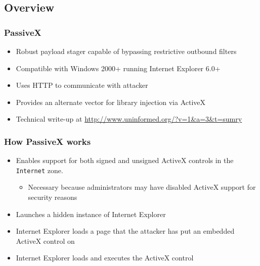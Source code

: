 \documentclass{beamer}
\newenvironment{sitemize}{\vspace{1mm}\begin{itemize}\itemsep 4pt\small}{\end{itemize}}
\begin{document}
\subsection{Overview}
\begin{frame}[t]
    \frametitle{PassiveX}

    \begin{sitemize}
        \item Robust payload stager capable of bypassing restrictive
        outbound filters
        \item Compatible with Windows 2000+ running Internet
        Explorer 6.0+
        \item Uses HTTP to communicate with attacker
        \item Provides an alternate vector for library injection via
        ActiveX
        \item Technical write-up at
        \footnotesize{\url{http://www.uninformed.org/?v=1&a=3&t=sumry}}
    \end{sitemize}
\end{frame}

\begin{frame}[t]
    \frametitle{How PassiveX works}

    \begin{sitemize}
        \item Enables support for both signed and unsigned ActiveX
        controls in the \texttt{Internet} zone.
        \begin{sitemize}
            \pause
            \item Necessary because administrators may have disabled
            ActiveX support for security reasons
        \end{sitemize}

        \pause
        \item Launches a hidden instance of Internet Explorer

        \pause
        \item Internet Explorer loads a page that the attacker
        has put an embedded ActiveX control on

        \pause
        \item Internet Explorer loads and executes the ActiveX
        control
    \end{sitemize}
\end{frame}
\end{document}
